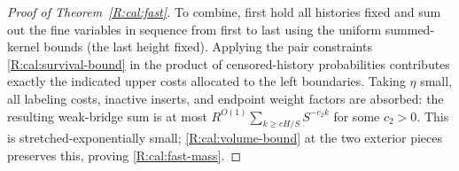 \begin{proof}[Proof of Theorem~\ref{R:cal:fast}]
To combine, first hold all histories fixed and sum out the fine variables in sequence from first to last using the uniform summed-kernel bounds (the last height fixed). Applying the pair constraints \eqref{R:cal:survival-bound} in the product of censored-history probabilities contributes exactly the indicated upper costs allocated to the left boundaries. Taking \(\eta\) small, all labeling costs, inactive inserts, and endpoint weight factors are absorbed: the resulting weak-bridge sum is at most \(R^{O(1)}\sum_{k\ge cH/S} S^{-c_2 k}\) for some \(c_2>0\). This is stretched-exponentially small; \eqref{R:cal:volume-bound} at the two exterior pieces preserves this, proving \eqref{R:cal:fast-mass}.

\end{proof}

